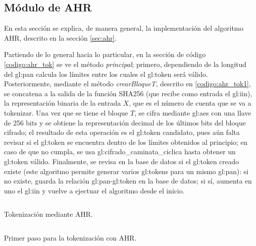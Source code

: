 %
%
%

\subsection{Módulo de AHR}
En esta sección se explica, de manera general, la implementación del algoritmo
AHR, descrito en la sección \ref{sec:ahr}.

Partiendo de lo general hacia lo particular, en la sección de código
\ref{codigo:ahr_tok} se ve el método \textit{principal}; primero, dependiendo de
la longitud del \gls{gl:pan} calcula los límites entre los cuales el
\gls{gl:token} será válido. Posteriormente, mediante el método
\textit{crearBloqueT}, descrito en \ref{codigo:ahr_tok1}, se concatena a la
salida de la función SHA256 (que recibe como entrada el \gls{gl:iin}), la
representación binaria de la entrada $X$, que es el número de cuenta que se
va a tokenizar. Una vez que se tiene el bloque $T$, se cifra mediante
\gls{gl:aes} con una llave de 256 bits y se obtiene la representación decimal
de los últimos bits del bloque cifrado; el resultado de esta operación es
el \gls{gl:token} candidato, pues aún falta revisar si el \gls{gl:token} se
encuentra dentro de los límites obtenidos al principio; en caso de que no
cumpla, se usa \gls{gl:cifrado_caminata_ciclica} hasta obtener un \gls{gl:token}
válido. Finalmente, se revisa en la base de datos si el \gls{gl:token} creado
existe (este algoritmo permite generar varios \glspl{gl:token} para un mismo
\gls{gl:pan}): si no existe, guarda la relación \gls{gl:pan}-\gls{gl:token} en
la base de datos; si sí, aumenta en uno el \gls{gl:iin} y vuelve a ejectuar
el algoritmo desde el inicio.

\begin{listing}
  \inputminted[firstline=284, lastline=328]
    {c++}{../implementaciones/ahr/ahr.cpp}
  \caption{Tokenización mediante AHR.}
  \label{codigo:ahr_tok}
\end{listing}

\begin{listing}
  \inputminted[firstline=193, lastline=223]
    {c++}{../implementaciones/ahr/ahr.cpp}
  \caption{Primer paso para la tokenización con AHR.}
  \label{codigo:ahr_tok1}
\end{listing}
